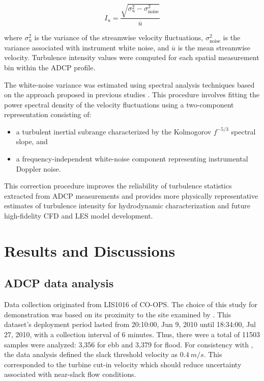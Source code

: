 \documentclass[12pt,sort&compress]{elsarticle}
\theoremstyle{definition}%
\begin{document}
\[
I_u
=
\frac{
\sqrt{
\sigma_u^2
-
\sigma_{\text{noise}}^2
}
}{
\overline{u}
}
\]

where \(\sigma_u^2\) is the variance of the streamwise velocity fluctuations, \(\sigma_{\text{noise}}^2\) is the variance associated with instrument white noise, and \(\overline{u}\) is the mean streamwise velocity. Turbulence intensity values were computed for each spatial measurement bin within the ADCP profile.

The white-noise variance was estimated using spectral analysis techniques based on the approach proposed in previous studies \cite{sellar_characterisation_2018}. This procedure involves fitting the power spectral density of the velocity fluctuations using a two-component representation consisting of:

\begin{itemize}

\item a turbulent inertial subrange characterized by the Kolmogorov \(f^{-5/3}\) spectral slope, and

\item a frequency-independent white-noise component representing instrumental Doppler noise.

\end{itemize}

This correction procedure improves the reliability of turbulence statistics extracted from ADCP measurements and provides more physically representative estimates of turbulence intensity for hydrodynamic characterization and future high-fidelity CFD and LES model development.

\section{Results and Discussions}
\label{sec:3}
\subsection{ADCP data analysis}
\label{sec:3.1}

\noindent Data collection originated from LIS1016 of CO-OPS. The choice of this study for demonstration was based on its proximity to the site examined by \citet{husoVP2026}. This dataset's deployment period lasted from 20:10:00, Jun 9, 2010 until 18:34:00, Jul 27, 2010, with a collection interval of 6 minutes. Thus, there were a total of 11503 samples were analyzed: 3,356 for ebb and 3,379 for flood. For consistency with \citet{husoVP2026}, the data analysis defined the slack threshold velocity as \(0.4~m/s\). This corresponded to the turbine cut-in velocity which should reduce uncertainty associated with near-slack flow conditions.
\end{document}
